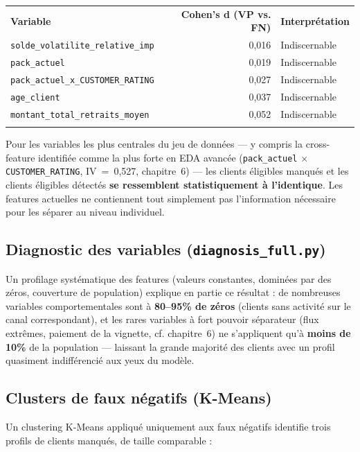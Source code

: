 \documentclass[11pt,a4paper]{report}
\let\oldtoprule\toprule
\renewcommand{\toprule}{\arrayrulecolor{corpslate}\oldtoprule\arrayrulecolor{black}}
\let\oldmidrule\midrule
\renewcommand{\midrule}{\arrayrulecolor{emsigreen}\oldmidrule\arrayrulecolor{black}}
\let\oldbottomrule\bottomrule
\renewcommand{\bottomrule}{\arrayrulecolor{corpslate}\oldbottomrule\arrayrulecolor{black}}
\begin{document}
\begin{center}
\begin{tabular}{@{}lrl@{}}
\toprule
\rowcolor{corpslate!10}
\textbf{Variable} & \textbf{Cohen's d (VP vs. FN)} & \textbf{Interprétation} \\
\midrule
\texttt{solde\_volatilite\_relative\_imp} & 0,016 & Indiscernable \\
\texttt{pack\_actuel} & 0,019 & Indiscernable \\
\texttt{pack\_actuel\_x\_CUSTOMER\_RATING} & 0,027 & Indiscernable \\
\texttt{age\_client} & 0,037 & Indiscernable \\
\texttt{montant\_total\_retraits\_moyen} & 0,052 & Indiscernable \\
\bottomrule
\end{tabular}
\end{center}

Pour les variables les plus centrales du jeu de données — y compris la
cross-feature identifiée comme la plus forte en EDA avancée
(\texttt{pack\_actuel} $\times$ \texttt{CUSTOMER\_RATING}, IV~=~0,527,
chapitre~6) — les clients éligibles manqués et les clients éligibles
détectés \textbf{se ressemblent statistiquement à l'identique}. Les
features actuelles ne contiennent tout simplement pas l'information
nécessaire pour les séparer au niveau individuel.

\subsection{Diagnostic des variables (\texttt{diagnosis\_full.py})}
Un profilage systématique des features (valeurs constantes, dominées par
des zéros, couverture de population) explique en partie ce résultat : de
nombreuses variables comportementales sont à \textbf{80--95\% de zéros}
(clients sans activité sur le canal correspondant), et les rares
variables à fort pouvoir séparateur (flux extrêmes, paiement de la
vignette, cf. chapitre~6) ne s'appliquent qu'à \textbf{moins de 10\%} de
la population — laissant la grande majorité des clients avec un profil
quasiment indifférencié aux yeux du modèle.

\subsection{Clusters de faux négatifs (K-Means)}
Un clustering K-Means appliqué uniquement aux faux négatifs identifie
trois profils de clients manqués, de taille comparable :
\end{document}
